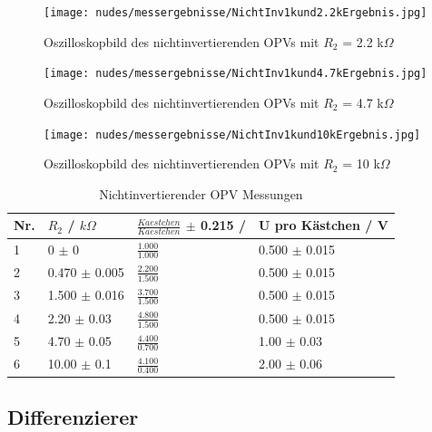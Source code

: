 \documentclass[12pt,a4paper,twoside]{article}
\begin{document}
\begin{figure}[H]
    \centering
    \texttt{[image: nudes/messergebnisse/NichtInv1kund2.2kErgebnis.jpg]}
    \caption{Oszilloskopbild des nichtinvertierenden OPVs mit $R_{2}$ = 2.2 k$\Omega$}
    \label{fig:Nichtinvertierender1k2.2kOszibild}
\end{figure}

\begin{figure}[H]
    \centering
    \texttt{[image: nudes/messergebnisse/NichtInv1kund4.7kErgebnis.jpg]}
    \caption{Oszilloskopbild des nichtinvertierenden OPVs mit $R_{2}$ = 4.7 k$\Omega$}
    \label{fig:Nichtinvertierender1k4.7kOszibild}
\end{figure}

\begin{figure}[H]
    \centering
    \texttt{[image: nudes/messergebnisse/NichtInv1kund10kErgebnis.jpg]}
    \caption{Oszilloskopbild des nichtinvertierenden OPVs mit $R_{2}$ = 10 k$\Omega$}
    \label{fig:Nichtinvertierender1k10kOszibild}
\end{figure}

\begin{table}[H]
    \centering
    \caption{Nichtinvertierender OPV Messungen}
    \label{tab:NioVerstärkungenGemessen}
    \begin{tabular}{| l | l | l | l |}
        \hline
        Nr. & $R_{2}$ / $k \Omega$ & $\frac{Kaestchen}{Kaestchen}$ $\pm$ 0.215 / & U pro Kästchen / V \\
        \hline
        1 &  0 $\pm$ 0 & $\frac{1.000}{1.000}$ & 0.500 $\pm$ 0.015 \\
        2 &  0.470 $\pm$ 0.005 & $\frac{2.200}{1.500}$ & 0.500 $\pm$ 0.015 \\
        3 &  1.500 $\pm$ 0.016 & $\frac{3.700}{1.500}$ & 0.500 $\pm$ 0.015 \\
        4 &  2.20 $\pm$  0.03  & $\frac{4.800}{1.500}$ & 0.500 $\pm$ 0.015 \\
        5 &  4.70 $\pm$  0.05  & $\frac{4.400}{0.700}$ & 1.00 $\pm$ 0.03 \\
        6 & 10.00 $\pm$  0.1   & $\frac{4.100}{0.400}$ & 2.00 $\pm$ 0.06 \\
        \hline
    \end{tabular}
\end{table}


\subsection{Differenzierer}
\end{document}
